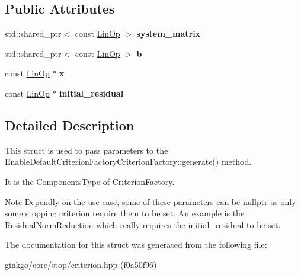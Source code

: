 \subsection*{Public Attributes}
\begin{DoxyCompactItemize}
\item 
\mbox{\label{structgko_1_1stop_1_1CriterionArgs_a2aa22bea76fd64352a446cf6c5570807}} 
std\+::shared\+\_\+ptr$<$ const \hyperlink{classgko_1_1LinOp}{Lin\+Op} $>$ {\bfseries system\+\_\+matrix}
\item 
\mbox{\label{structgko_1_1stop_1_1CriterionArgs_a994457497657a0308c5343e711ec4c3e}} 
std\+::shared\+\_\+ptr$<$ const \hyperlink{classgko_1_1LinOp}{Lin\+Op} $>$ {\bfseries b}
\item 
\mbox{\label{structgko_1_1stop_1_1CriterionArgs_a766a5c79ca77e74703888786e0011a73}} 
const \hyperlink{classgko_1_1LinOp}{Lin\+Op} $\ast$ {\bfseries x}
\item 
\mbox{\label{structgko_1_1stop_1_1CriterionArgs_af7233105d01a9b055b15652daf179a67}} 
const \hyperlink{classgko_1_1LinOp}{Lin\+Op} $\ast$ {\bfseries initial\+\_\+residual}
\end{DoxyCompactItemize}


\subsection{Detailed Description}
This struct is used to pass parameters to the Enable\+Default\+Criterion\+Factory\+Criterion\+Factory\+::generate() method. 

It is the Components\+Type of Criterion\+Factory.

\begin{DoxyNote}{Note}
Dependly on the use case, some of these parameters can be {\ttfamily nullptr} as only some stopping criterion require them to be set. An example is the {\ttfamily \hyperlink{classgko_1_1stop_1_1ResidualNormReduction}{Residual\+Norm\+Reduction}} which really requires the {\ttfamily initial\+\_\+residual} to be set. 
\end{DoxyNote}


The documentation for this struct was generated from the following file\+:\begin{DoxyCompactItemize}
\item 
ginkgo/core/stop/criterion.\+hpp (f0a50f96)\end{DoxyCompactItemize}
